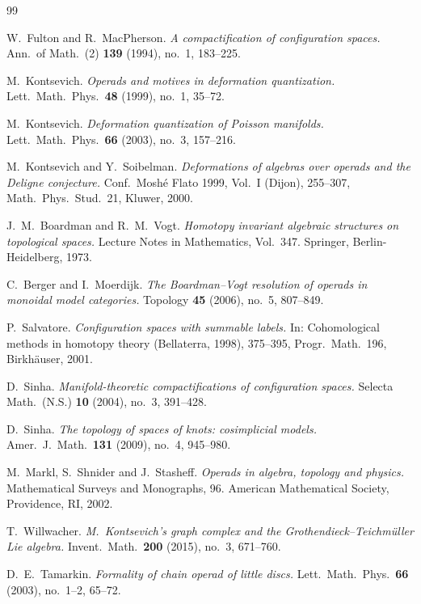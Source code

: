 \documentclass[11pt]{article}
\theoremstyle{definition}
\theoremstyle{remark}
\begin{document}
\begin{thebibliography}{99}

W.\ Fulton and R.\ MacPherson.
\emph{A compactification of configuration spaces.}
Ann.\ of Math.\ (2) \textbf{139} (1994), no.\ 1, 183--225.

M.\ Kontsevich.
\emph{Operads and motives in deformation quantization.}
Lett.\ Math.\ Phys.\ \textbf{48} (1999), no.\ 1, 35--72.

M.\ Kontsevich.
\emph{Deformation quantization of Poisson manifolds.}
Lett.\ Math.\ Phys.\ \textbf{66} (2003), no.\ 3, 157--216.

M.\ Kontsevich and Y.\ Soibelman.
\emph{Deformations of algebras over operads and the Deligne conjecture.}
Conf.\ Mosh\'e Flato 1999, Vol.\ I (Dijon), 255--307, Math.\ Phys.\ Stud.\ 21, Kluwer, 2000.

J.\ M.\ Boardman and R.\ M.\ Vogt.
\emph{Homotopy invariant algebraic structures on topological spaces.}
Lecture Notes in Mathematics, Vol.\ 347. Springer, Berlin-Heidelberg, 1973.

C.\ Berger and I.\ Moerdijk.
\emph{The Boardman--Vogt resolution of operads in monoidal model categories.}
Topology \textbf{45} (2006), no.\ 5, 807--849.

P.\ Salvatore.
\emph{Configuration spaces with summable labels.}
In: Cohomological methods in homotopy theory (Bellaterra, 1998), 375--395, Progr.\ Math.\ 196, Birkh\"auser, 2001.

D.\ Sinha.
\emph{Manifold-theoretic compactifications of configuration spaces.}
Selecta Math.\ (N.S.) \textbf{10} (2004), no.\ 3, 391--428.

D.\ Sinha.
\emph{The topology of spaces of knots: cosimplicial models.}
Amer.\ J.\ Math.\ \textbf{131} (2009), no.\ 4, 945--980.

M.\ Markl, S.\ Shnider and J.\ Stasheff.
\emph{Operads in algebra, topology and physics.}
Mathematical Surveys and Monographs, 96. American Mathematical Society, Providence, RI, 2002.

T.\ Willwacher.
\emph{M.\ Kontsevich's graph complex and the Grothendieck--Teichm\"uller Lie algebra.}
Invent.\ Math.\ \textbf{200} (2015), no.\ 3, 671--760.

D.\ E.\ Tamarkin.
\emph{Formality of chain operad of little discs.}
Lett.\ Math.\ Phys.\ \textbf{66} (2003), no.\ 1--2, 65--72.


\end{thebibliography}
\end{document}
